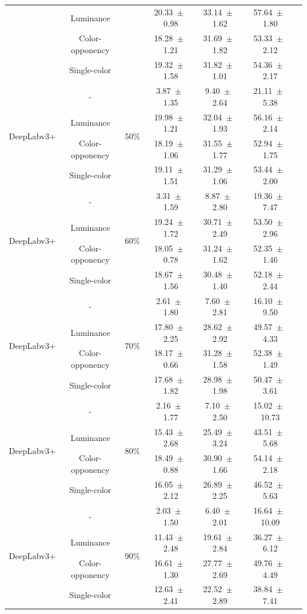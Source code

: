 \begin{table}[h]
\begin{tabular}{@{}lccc ccc@{}}
& Luminance & & 20.33~$\pm$~0.98 & 33.14~$\pm$~1.62 & 57.64~$\pm$~1.80 \\
& Color-opponency & & 18.28~$\pm$~1.21 & 31.69~$\pm$~1.82 & 53.33~$\pm$~2.12 \\
& Single-color & & 19.32~$\pm$~1.58 & 31.82~$\pm$~1.01 & 54.36~$\pm$~2.17 \\
\midrule
\multirow{4}{*}{DeepLabv3+} & - & \multirow{4}{*}{50\%} & 3.87~$\pm$~1.35 & 9.40~$\pm$~2.64 & 21.11~$\pm$~5.38 \\
& Luminance & & 19.98~$\pm$~1.21 & 32.04~$\pm$~1.93 & 56.16~$\pm$~2.14 \\
& Color-opponency & & 18.19~$\pm$~1.06 & 31.55~$\pm$~1.77 & 52.94~$\pm$~1.75 \\
& Single-color & & 19.11~$\pm$~1.51 & 31.29~$\pm$~1.06 & 53.44~$\pm$~2.00 \\
\midrule
\multirow{4}{*}{DeepLabv3+} & - & \multirow{4}{*}{60\%} & 3.31~$\pm$~1.59 & 8.87~$\pm$~2.80 & 19.36~$\pm$~7.47 \\
& Luminance & & 19.24~$\pm$~1.72 & 30.71~$\pm$~2.49 & 53.50~$\pm$~2.96 \\
& Color-opponency & & 18.05~$\pm$~0.78 & 31.24~$\pm$~1.62 & 52.35~$\pm$~1.46 \\
& Single-color & & 18.67~$\pm$~1.56 & 30.48~$\pm$~1.40 & 52.18~$\pm$~2.44 \\
\midrule
\multirow{4}{*}{DeepLabv3+} & - & \multirow{4}{*}{70\%} & 2.61~$\pm$~1.80 & 7.60~$\pm$~2.81 & 16.10~$\pm$~9.50 \\
& Luminance & & 17.80~$\pm$~2.25 & 28.62~$\pm$~2.92 & 49.57~$\pm$~4.33 \\
& Color-opponency & & 18.17~$\pm$~0.66 & 31.28~$\pm$~1.58 & 52.38~$\pm$~1.49 \\
& Single-color & & 17.68~$\pm$~1.82 & 28.98~$\pm$~1.98 & 50.47~$\pm$~3.61 \\
\midrule
\multirow{4}{*}{DeepLabv3+} & - & \multirow{4}{*}{80\%} & 2.16~$\pm$~1.77 & 7.10~$\pm$~2.50 & 15.02~$\pm$~10.73 \\
& Luminance & & 15.43~$\pm$~2.68 & 25.49~$\pm$~3.24 & 43.51~$\pm$~5.68 \\
& Color-opponency & & 18.49~$\pm$~0.88 & 30.90~$\pm$~1.66 & 54.14~$\pm$~2.18 \\
& Single-color & & 16.05~$\pm$~2.12 & 26.89~$\pm$~2.25 & 46.52~$\pm$~5.63 \\
\midrule
\multirow{4}{*}{DeepLabv3+} & - & \multirow{4}{*}{90\%} & 2.03~$\pm$~1.50 & 6.40~$\pm$~2.01 & 16.64~$\pm$~10.09 \\
& Luminance & & 11.43~$\pm$~2.48 & 19.61~$\pm$~2.84 & 36.27~$\pm$~6.12 \\
& Color-opponency & & 16.61~$\pm$~1.30 & 27.77~$\pm$~2.69 & 49.76~$\pm$~4.49 \\
& Single-color & & 12.63~$\pm$~2.41 & 22.52~$\pm$~2.89 & 38.84~$\pm$~7.41 \\
\midrule
\bottomrule
\end{tabular}
\label{tab:sparse_results_deeplabv3plus_acdc_night}
\end{table}